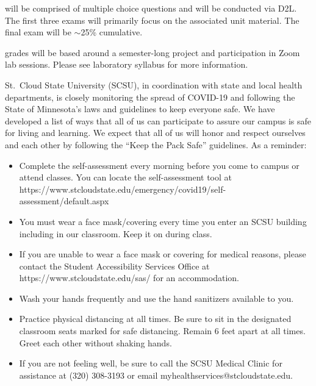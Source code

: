 \documentclass{tufte-handout}
\begin{document}
\newpage 
\begin{fullwidth}

 will be comprised of multiple choice questions and will be conducted via D2L. The first three exams will primarily focus on the associated unit material. The final exam will be $\sim$25\% cumulative. 




 grades will be based around a semester-long project and participation in Zoom lab sessions. Please see laboratory syllabus for more information. 



St.\ Cloud State University (SCSU), in coordination with state and local health departments, is closely monitoring the spread of COVID-19 and following the State of Minnesota's laws and guidelines to keep everyone safe. We have developed a list of ways that all of us can participate to assure our campus is safe for living and learning. We expect that all of us will honor and respect ourselves and each other by following the ``Keep the Pack Safe'' guidelines. As a reminder:

\begin{itemize}
\item Complete the self-assessment every morning before you come to campus or attend classes. You can locate the self-assessment tool at https://www.stcloudstate.edu/emergency/covid19/self-assessment/default.aspx 
\item You must wear a face mask/covering every time you enter an SCSU building including in our classroom. Keep it on during class.
\item If you are unable to wear a face mask or covering for medical reasons, please contact the Student Accessibility Services Office at https://www.stcloudstate.edu/sas/ for an accommodation.
\item Wash your hands frequently and use the hand sanitizers available to you.
\item Practice physical distancing at all times. Be sure to sit in the designated classroom seats marked for safe distancing. Remain 6 feet apart at all times. Greet each other without shaking hands.
\item If you are not feeling well, be sure to call the SCSU Medical Clinic for assistance at (320) 308-3193 or email myhealthservices@stcloudstate.edu. 
\end{itemize}


\end{fullwidth}
\end{document}
